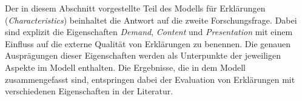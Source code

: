 \noindent{}

\smallskip

Der in diesem Abschnitt vorgestellte Teil des Modells für Erklärungen (\textit{Characteristics}) beinhaltet die Antwort auf die zweite Forschungsfrage. Dabei sind explizit die Eigenschaften \textit{Demand}, \textit{Content} und \textit{Presentation} mit einem Einfluss auf die externe Qualität von Erklärungen zu benennen. Die genauen Ausprägungen dieser Eigenschaften werden als Unterpunkte der jeweiligen Aspekte im Modell enthalten. Die Ergebnisse, die in dem Modell zusammengefasst sind, entspringen dabei der Evaluation von Erklärungen mit verschiedenen Eigenschaften in der Literatur.